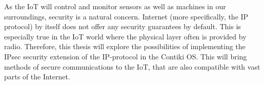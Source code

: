 \documentclass[final,a4paper,twoside,11pt,onecolumn]{report}
\begin{document}
As the IoT will control and monitor sensors as well as machines in our surroundings, security is a natural concern. Internet (more specifically, the IP protocol) by itself does not offer any security guarantees by default. This is especially true in the IoT world where the physical layer often is provided by radio. Therefore, this thesis will explore the possibilities of implementing the IPsec security extension of the IP-protocol in the Contiki OS. This will bring methods of secure communications to the IoT, that are also compatible with vast parts of the Internet.





\end{document}
